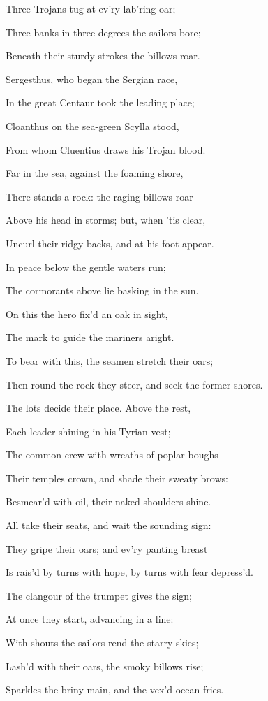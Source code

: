 Three Trojans tug at ev’ry lab’ring oar;

Three banks in three degrees the sailors bore;

Beneath their sturdy strokes the billows roar.

Sergesthus, who began the Sergian race,

In the great Centaur took the leading place;

Cloanthus on the sea-green Scylla stood,

From whom Cluentius draws his Trojan blood.

Far in the sea, against the foaming shore,

There stands a rock: the raging billows roar

Above his head in storms; but, when ’tis clear,

Uncurl their ridgy backs, and at his foot appear.

In peace below the gentle waters run;

The cormorants above lie basking in the sun.

On this the hero fix’d an oak in sight,

The mark to guide the mariners aright.

To bear with this, the seamen stretch their oars;

Then round the rock they steer, and seek the former shores.

The lots decide their place. Above the rest,

Each leader shining in his Tyrian vest;

The common crew with wreaths of poplar boughs

Their temples crown, and shade their sweaty brows:

Besmear’d with oil, their naked shoulders shine.

All take their seats, and wait the sounding sign:

They gripe their oars; and ev’ry panting breast

Is rais’d by turns with hope, by turns with fear depress’d.

The clangour of the trumpet gives the sign;

At once they start, advancing in a line:

With shouts the sailors rend the starry skies;

Lash’d with their oars, the smoky billows rise;

Sparkles the briny main, and the vex’d ocean fries.

